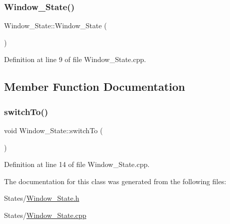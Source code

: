 \subsubsection{\texorpdfstring{Window\+\_\+\+State()}{Window\_State()}}
{\footnotesize\ttfamily Window\+\_\+\+State\+::\+Window\+\_\+\+State (\begin{DoxyParamCaption}{ }\end{DoxyParamCaption})}



Definition at line 9 of file Window\+\_\+\+State.\+cpp.



\subsection{Member Function Documentation}
\hypertarget{class_window___state_af1b365ecb6b56f60c9f389abc4ad1a1b}{}\label{class_window___state_af1b365ecb6b56f60c9f389abc4ad1a1b} 
\subsubsection{\texorpdfstring{switch\+To()}{switchTo()}}
{\footnotesize\ttfamily void Window\+\_\+\+State\+::switch\+To (\begin{DoxyParamCaption}{ }\end{DoxyParamCaption})}



Definition at line 14 of file Window\+\_\+\+State.\+cpp.



The documentation for this class was generated from the following files\+:\begin{DoxyCompactItemize}
\item 
States/\hyperlink{_window___state_8h}{Window\+\_\+\+State.\+h}\item 
States/\hyperlink{_window___state_8cpp}{Window\+\_\+\+State.\+cpp}\end{DoxyCompactItemize}
